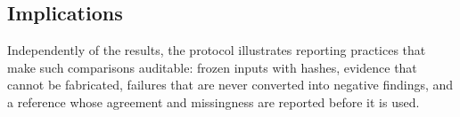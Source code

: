 \subsection{Implications}

 Independently of the results, the protocol illustrates reporting
practices that make such comparisons auditable: frozen inputs with hashes, evidence that cannot be
fabricated, failures that are never converted into negative findings, and a reference whose agreement and
missingness are reported before it is used.
